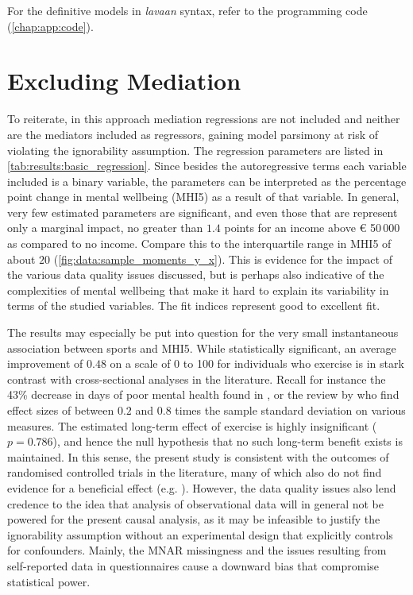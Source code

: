 For the definitive models in \textit{lavaan} syntax, refer to the programming code (\cref{chap:app:code}).

\section{Excluding Mediation}
\label{sec:results:no_mediation}

To reiterate, in this approach mediation regressions are not included and neither are the mediators included as regressors,
gaining model parsimony at risk of violating the ignorability assumption.
The regression parameters are listed in \cref{tab:results:basic_regression}. Since besides the autoregressive
terms each variable included is a binary variable, the parameters can be interpreted as the percentage point change
in mental wellbeing (MHI5) as a result of that variable.
In general, very few estimated parameters are significant, and even those that are represent only a marginal impact,
no greater than $1.4$ points for an income above € 50\,000 as compared to no income. Compare this to the interquartile
range in MHI5 of about $20$ (\cref{fig:data:sample_moments_y_x}).
This is evidence for the impact of the various data quality issues discussed, but is perhaps also indicative of the
complexities of mental wellbeing that make it hard to explain its variability in terms of the studied variables.
The fit indices represent good to excellent fit.

The results may especially be put into question for the very small instantaneous association between sports and MHI5.
While statistically significant, an average improvement of $0.48$ on a scale of 0 to 100 for individuals who exercise
is in stark contrast with cross-sectional analyses in the literature. Recall for instance the 43\% decrease in days of poor mental
health found in , or the review by  who find effect sizes of between
$0.2$ and $0.8$ times the sample standard deviation on various measures.
The estimated long-term effect of exercise is highly insignificant ($p = 0.786$), and hence the null hypothesis that
no such long-term benefit exists is maintained. In this sense, the present study is consistent with the outcomes
of randomised controlled trials in the literature, many of which also do not find evidence for a beneficial effect
(e.g. ).
However, the data quality issues also lend credence to the idea that analysis of observational data will in general
not be powered for the present causal analysis, as it may be infeasible to justify the ignorability assumption
without an experimental design that explicitly controls for confounders. Mainly, the MNAR missingness and the issues resulting
from self-reported data in questionnaires cause a downward bias that compromise statistical power.


